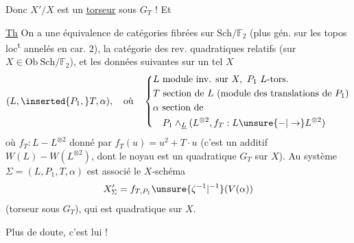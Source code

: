 
Donc $X'/X$ est un \uline{torseur} sous $G_T$ ! Et 

\uline{Th} On a une équivalence de catégories  fibrées sur $\mathrm{Sch}/\mathbb F_2$ (plus gén. sur les topos loc\textsuperscript{t} annelés en car. $2$),  la catégorie des rev. quadratiques relatifs (sur $X\in\mathrm{Ob}\ \mathrm{Sch}/\mathbb F_2$), et les données suivantes sur un tel $X$
\[
(L,\inserted{P_1,}T,\alpha),\quad\text{où}\quad\left\{\begin{aligned}&L\text{ module inv. sur }X,\ P_1\ L\text{-tors.}\\ &T\text{ section de }L\ \text{(module des translations de }P_1\text{)}\\ &\alpha\text{ section de}\\ &\quad P_1\wedge_{\underline L}(L^{\otimes2},f_T:L\unsure{\mathbin{-}|\to}L^{\otimes2})\end{aligned}\right.
\]
où $f_T:L\mathbin{-}L^{\otimes2}$ donné par $f_T(u)=u^2+T\cdot u$
(c'est un  additif $W(L)\mathbin{-}W(L^{\otimes2})$, dont le noyau est un    quadratique $G_T$ sur $X$).
Au système $\Sigma=(L,P_1,T,\alpha)$ est associé le $X$-schéma
\[
X'_\Sigma=f_{T,P_1}\unsure{\zeta^{-1}|{}^{-1}}(V(\alpha))
\]
(torseur sous $G_T$), qui est  quadratique sur $X$.

Plus de doute, c'est lui !

